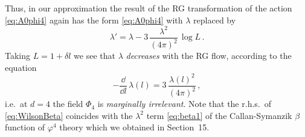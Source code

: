 Thus, in our approximation the result of the RG transformation of the action
\eqref{eq:A0phi4} again has the form \eqref{eq:A0phi4} with $\lambda$ replaced by
\[
\lambda'=\lambda-3\,\frac{\lambda^2}{(4\pi)^2}\,\log L\,.
\]
Taking $L=1+\delta l$ we see that $\lambda$ \emph{decreases} with the RG flow,
according to the equation
\begin{equation}\label{eq:WilsonBeta}
-\frac{\dd}{\dd l}\,\lambda(l)=3\,\frac{\lambda(l)^2}{(4\pi)^2}\,,
\end{equation}
i.e.\ at $d=4$ the field $\Phi_4$ is \emph{marginally irrelevant}. Note that the
r.h.s.\ of \eqref{eq:WilsonBeta} coincides with the $\lambda^2$ term
\eqref{eq:beta1} of the Callan-Symanzik $\beta$ function of $\varphi^4$ theory
which we obtained in Section~15.
